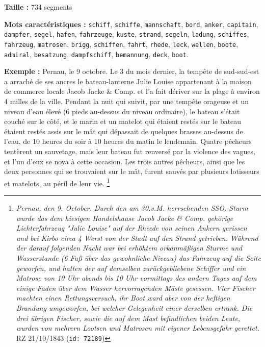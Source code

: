 \documentclass[a4paper,twoside,12pt]{article}
\begin{document}
\begin{flushleft}
\textbf{Taille :} 734 segments

\textbf{Mots caractéristiques :} \texttt{schiff}, \texttt{schiffe}, \texttt{mannschaft}, \texttt{bord}, \texttt{anker}, \texttt{capitain}, \texttt{dampfer}, \texttt{segel}, \texttt{hafen}, \texttt{fahrzeuge}, \texttt{kuste}, \texttt{strand}, \texttt{segeln}, \texttt{ladung}, \texttt{schiffes}, \texttt{fahrzeug}, \texttt{matrosen}, \texttt{brigg}, \texttt{schiffen}, \texttt{fahrt}, \texttt{rhede}, \texttt{leck}, \texttt{wellen}, \texttt{boote}, \texttt{admiral}, \texttt{besatzung}, \texttt{dampfschiff}, \texttt{bemannung}, \texttt{deck}, \texttt{boot}.
\end{flushleft}

\medskip

\noindent \textbf{Exemple :} \og Pernau, le 9 octobre. Le 3 du mois dernier, la tempête de sud-sud-est a arraché de ses ancres le bateau-lanterne \og Julie Louise \fg{} appartenant à la maison de commerce locale Jacob Jacke \& Comp. et l'a fait dériver sur la plage à environ 4 milles de la ville. Pendant la nuit qui suivit, par une tempête orageuse et un niveau d'eau élevé (6 pieds au-dessus du niveau ordinaire), le bateau s'était couché sur le côté, et le marin et un matelot qui étaient restés sur le bateau étaient restés assis sur le mât qui dépassait de quelques brasses au-dessus de l'eau, de 10 heures du soir à 10 heures du matin le lendemain. Quatre pêcheurs tentèrent un sauvetage, mais leur bateau fut renversé par la violence des vagues, et l'un d'eux se noya à cette occasion. Les trois autres pêcheurs, ainsi que les deux personnes qui se trouvaient sur le mât, furent sauvés par plusieurs lotisseurs et matelots, au péril de leur vie. \fg{}\footnote{\textit{ Pernau, den 9. October. Durch den am 30.v.M. herrschenden SSO.-Sturm wurde das dem hiesigen Handelshause Jacob Jacke \& Comp. gehörige Lichterfahrzeug "Julie Louise" auf der Rheede von seinen Ankern gerissen und bei Kirbo circa 4 Werst von der Stadt auf den Strand getrieben. Während der darauf folgenden Nacht war bei erhöhtem orkanmäßigen Sturme und Wasserstande (6 Fuß über das gewohnliche Niveau) das Fahrzeug auf die Seite geworfen, und hatten der auf demselben zurückgebliebene
Schiffer und ein Matrose von 10 Uhr abends bis 10 Uhr vormittags des andern Tages auf dem einige Faden über dem Wasser hervorragenden Mäste gesessen. Vier Fischer machten einen Rettungsversuch, ihr Boot ward aber von der heftigen Brandung umgeworfen, bei welcher Gelegenheit einer derselben ertrank. Die drei übrigen Fischer, sowie die auf dem Mast befindlichen beiden Leute, wurden von mehrern Lootsen und Matrosen mit eigener Lebensgefahr gerettet.} RZ 21/10/1843 (\texttt{id: 72189})}
\end{document}
